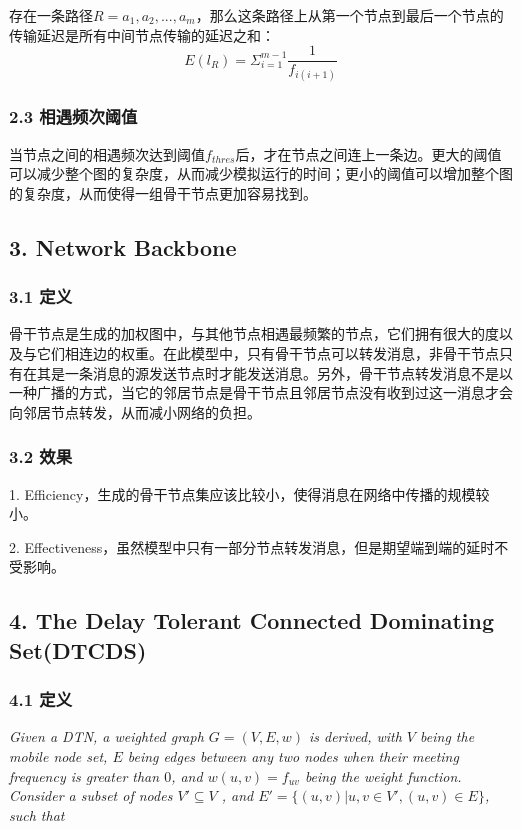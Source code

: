 \documentclass[lang=cn,11pt]{elegantpaper}
\begin{document}
	存在一条路径$R = a_1,a_2,...,a_m$，那么这条路径上从第一个节点到最后一个节点的传输延迟是所有中间节点传输的延迟之和：
	$$
	E(l_R)=\Sigma^{m-1}_{i=1}\frac{1}{f_{i(i+1)}}
	$$
	
	\subsubsection*{2.3 相遇频次阈值}
	
	当节点之间的相遇频次达到阈值$f_{thres}$后，才在节点之间连上一条边。更大的阈值可以减少整个图的复杂度，从而减少模拟运行的时间；更小的阈值可以增加整个图的复杂度，从而使得一组骨干节点更加容易找到。
	
	\subsection*{3. Network Backbone}
	
	\subsubsection*{3.1 定义}
	
	骨干节点是生成的加权图中，与其他节点相遇最频繁的节点，它们拥有很大的度以及与它们相连边的权重。在此模型中，只有骨干节点可以转发消息，非骨干节点只有在其是一条消息的源发送节点时才能发送消息。另外，骨干节点转发消息不是以一种广播的方式，当它的邻居节点是骨干节点且邻居节点没有收到过这一消息才会向邻居节点转发，从而减小网络的负担。
	
	\subsubsection*{3.2 效果}
	
	1. Efficiency，生成的骨干节点集应该比较小，使得消息在网络中传播的规模较小。
	
	2. Effectiveness，虽然模型中只有一部分节点转发消息，但是期望端到端的延时不受影响。
	
	\subsection*{4. The Delay Tolerant Connected Dominating Set(DTCDS)}
	
	\subsubsection*{4.1 定义}
	
	\emph{Given a DTN, a weighted graph $G = (V,E,w)$ is derived, with $V$ being the mobile node set, $E$ being edges between any two nodes when their meeting frequency is greater than $0$, and $w(u, v) = f_{uv}$ being the weight function. Consider a subset of nodes $V' \subseteq V$ , and $E'= \{(u,v)|u,v \in V',(u, v) \in E\}$, such that}
	
\end{document}
